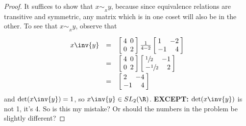 \documentclass[letterpaper]{article}
\begin{document}
\begin{enumerate}
\begin{enumerate}
\begin{proof}
	It suffices to show that $x\sim_{{}_R} y$, because since equivalence relations are transitive and symmetric, any matrix which is in one coset will also be in the other. To see that $x\sim_{{}_R} y$, observe that 
	\[\def\arraystretch{2}\begin{array}{rcl}
	x\inv{y}&=&
	\arraycolsep=2.4pt\def\arraystretch{1}
	\left[\begin{array}{lr}
	4 & 0 \\
	0 & 2 \\
	\end{array} \right]
	\frac{1}{4-2}
	\arraycolsep=2.4pt\def\arraystretch{1}
	\left[\begin{array}{lr}
	1 & -2 \\
	-1 & 4 \\
	\end{array} \right]
	\\
	&=&
	\arraycolsep=2.4pt\def\arraystretch{1}
	\left[\begin{array}{lr}
	4 & 0 \\
	0 & 2 \\
	\end{array} \right]
	\arraycolsep=2.4pt\def\arraystretch{1}
	\left[\begin{array}{lr}
	\sfrac{1}{2} & -1 \\
	-\sfrac{1}{2} & 2 \\
	\end{array} \right]
	\\
	&=&
	\arraycolsep=2.4pt\def\arraystretch{1}
	\left[\begin{array}{lr}
	2 & -4 \\
	-1 & 4 \\
	\end{array} \right]
	\end{array}\]
	and $\det(x\inv{y})=1$, so $x\inv{y}\in SL_2(\R)$. \textbf{EXCEPT:} $\det(x\inv{y})$ is not 1, it's 4. So is this my mistake? Or should the numbers in the problem be slightly different?
	
	\end{proof}
	\end{enumerate}



\end{enumerate}
\end{document}
